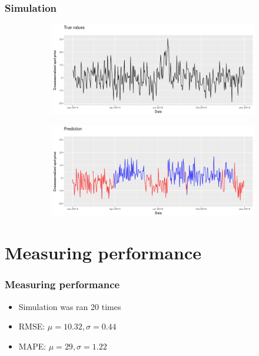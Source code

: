 \documentclass{beamer}
\begin{document}
\begin{frame}
\frametitle{Simulation}

\begin{figure}
\centering
   \begin{subfigure}[b]{0.7\textwidth}
   \includegraphics[width=1\linewidth]{true.png}
   \label{fig:Ng1} 
\end{subfigure}

\begin{subfigure}[b]{0.7\textwidth}
   \includegraphics[width=1\linewidth]{prediction.png}
   \label{fig:Ng2}
\end{subfigure}

\end{figure}
\end{frame}


\section{Measuring performance}


\begin{frame}
\frametitle{Measuring performance}

\begin{itemize}
\item Simulation was ran 20 times
\item RMSE: $\mu = 10.32, \sigma = 0.44$
\item MAPE: $\mu = 29, \sigma = 1.22$
\end{itemize}


\end{frame}
\end{document}
